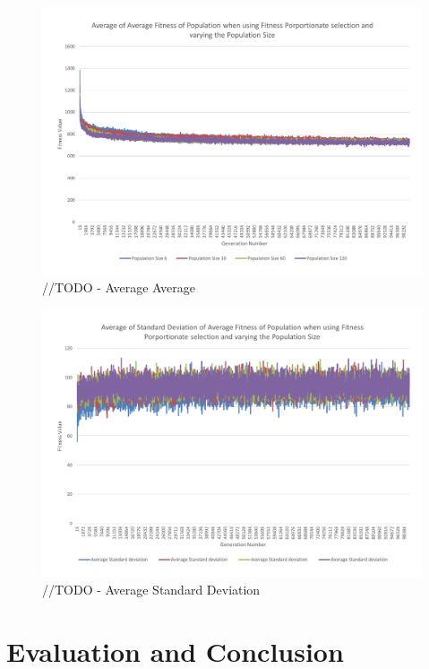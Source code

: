 \begin{figure}
	\centerline{\includegraphics[width=\paperwidth]{figures/CircleTests/CirclePopulationSizeControllAverageAverage.pdf}}
	\caption{//TODO - Average Average}
\end{figure}

\begin{figure}
	\centerline{\includegraphics[width=\paperwidth]{figures/CircleTests/CirclePopulationSizeControllAverageStandardDeviation.pdf}}
	\caption{//TODO - Average Standard Deviation}
\end{figure}


\clearpage
\section{Evaluation and Conclusion} %
\label{sec:evaluation_and_conclusion}


